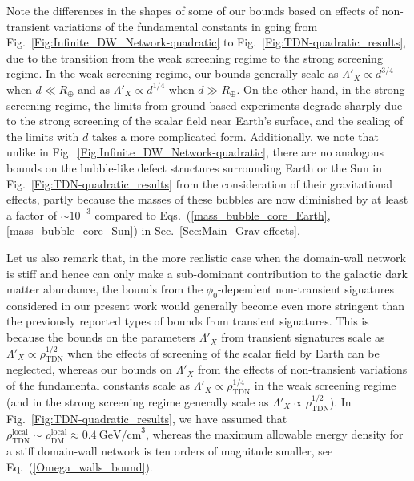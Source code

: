 \documentclass[aps,prd,onecolumn,nofootinbib]{revtex4-2} %
\begin{document}
Note the differences in the shapes of some of our bounds based on effects of non-transient variations of the fundamental constants in going from Fig.~\ref{Fig:Infinite_DW_Network-quadratic} to Fig.~\ref{Fig:TDN-quadratic_results}, due to the transition from the weak screening regime to the strong screening regime. 
In the weak screening regime, our bounds generally scale as $\Lambda'_X \propto d^{3/4}$ when $d \ll R_\oplus$ and as $\Lambda'_X \propto d^{1/4}$ when $d \gg R_\oplus$. 
On the other hand, in the strong screening regime, the limits from ground-based experiments degrade sharply due to the strong screening of the scalar field near Earth's surface, and the scaling of the limits with $d$ takes a more complicated form. 
Additionally, we note that unlike in Fig.~\ref{Fig:Infinite_DW_Network-quadratic}, there are no analogous bounds on the bubble-like defect structures surrounding Earth or the Sun in Fig.~\ref{Fig:TDN-quadratic_results} from the consideration of their gravitational effects, partly because the masses of these bubbles are now diminished by at least a factor of $\sim 10^{-3}$ compared to Eqs.~(\ref{mass_bubble_core_Earth},\ref{mass_bubble_core_Sun}) in Sec.~\ref{Sec:Main_Grav-effects}. 

Let us also remark that, in the more realistic case when the domain-wall network is stiff and hence can only make a sub-dominant contribution to the galactic dark matter abundance, the bounds from the $\phi_0$-dependent non-transient signatures considered in our present work would generally become even more stringent than the previously reported types of bounds from transient signatures. 
This is because the bounds on the parameters $\Lambda'_X$ from transient signatures scale as $\Lambda'_X \propto \rho_\textrm{TDN}^{1/2}$ when the effects of screening of the scalar field by Earth can be neglected, whereas our bounds on $\Lambda'_X$ from the effects of non-transient variations of the fundamental constants scale as $\Lambda'_X \propto \rho_\textrm{TDN}^{1/4}$ in the weak screening regime (and in the strong screening regime generally scale as $\Lambda'_X \propto \rho_\textrm{TDN}^{1/2}$). 
In Fig.~\ref{Fig:TDN-quadratic_results}, we have assumed that $\rho_\textrm{TDN}^\textrm{local} \sim \rho_\textrm{DM}^\textrm{local} \approx 0.4~\textrm{GeV/cm}^3$, whereas the maximum allowable energy density for a stiff domain-wall network is ten orders of magnitude smaller, see Eq.~(\ref{Omega_walls_bound}). 



\vspace{200mm}
\end{document}
